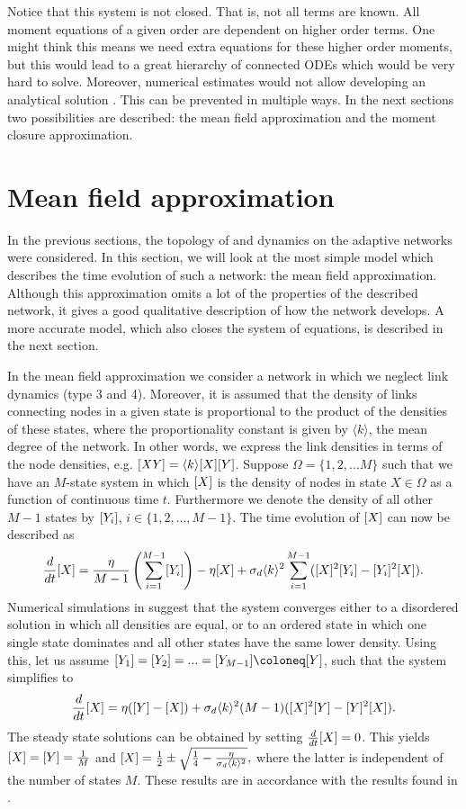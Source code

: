 Notice that this system is not closed. That is, not all terms are known. All moment equations of a given order are dependent on higher order terms. One might think this means we need extra equations for these higher order moments, but this would lead to a great hierarchy of connected ODEs which would be very hard to solve. Moreover, numerical estimates would not allow developing an analytical solution \cite{Demirel2014}. This can be prevented in multiple ways. In the next sections two possibilities are described: the mean field approximation and the moment closure approximation.  


\section{Mean field approximation}
In the previous sections, the topology of and dynamics on the adaptive networks were considered.  In this section, we will look at the most simple model which describes the time evolution of such a network: the mean field approximation. Although this approximation omits a lot of the properties of the described network, it gives a good qualitative description of how the network develops. A more accurate model, which also closes the system of equations, is described in the next section. 

In the mean field approximation we consider a network in which we neglect link dynamics (type 3 and 4). Moreover, it is assumed that the density of links connecting nodes in a given state is proportional to the product of the densities of these states, where the proportionality constant is given by $\langle k \rangle$, the mean degree of the network. In other words, we express the link densities in terms of the node densities, e.g. $\mathit{[XY]} = \langle k \rangle [X][Y]$.  Suppose $\Omega = \{1,2,...M\}$ such that we have an $M$-state system in which $[X]$ is the density of nodes in state $X\in\Omega$ as a function of continuous time $t$. Furthermore we denote the density of all other $M-1$ states by $[Y_i]$, $i \in \{1,2,...,M-1\}$. The time evolution of $[X]$ can now be described as 
\begin{equation}
	\frac{d}{dt}[X] = \frac{\eta}{M-1} \left( \sum\limits_{i=1}^{M-1} [Y_i] \right) - \eta[X] + \sigma_d \langle k \rangle ^2 \sum\limits_{i=1}^{M-1} ([X]^2[Y_i] - [Y_i]^2 [X]).
\end{equation}
Numerical simulations in \cite{Chen2016} suggest that the system converges either to a disordered solution in which all densities are equal, or to an ordered state in which one single state dominates and all other states have the same lower density. Using this, let us assume $[Y_1] = [Y_2] = ... = [Y_{M-1}] \coloneq \Y$, such that the system simplifies to 
\begin{equation}
\frac{d}{dt}[X] = \eta ([Y]-[X]) + \sigma_d \langle k \rangle ^2 (M-1) ([X]^2[Y] - [Y]^2 [X]).
\end{equation}
The steady state solutions can be obtained by setting $\frac{d}{dt}[X] =0$. This yields
$
	[X]=[Y]=\frac{1}{M}
$
and
$
	[X] = \frac{1}{2} \pm \sqrt{\frac{1}{4} - \frac{\eta}{\sigma_d \langle k \rangle ^2}},
$
where the latter is independent of the number of states $M$. These results are in accordance with the results found in \cite{Chen2016}.

